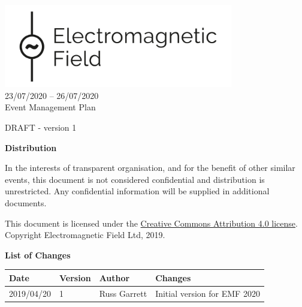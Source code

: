 

\newcommand{\st}{\textsuperscript{st} }
\newcommand{\nd}{\textsuperscript{nd} }
\renewcommand{\th}{\textsuperscript{th} }
\newcommand{\rd}{\textsuperscript{rd} }
\newcommand{\sq}{\textsuperscript{2}}




\begin{titlepage}
\thispagestyle{empty}
\begin{center}
    \includegraphics[width=10cm]{../resources/emf-logo.png}\\[24pt]
    {\LARGE 23/07/2020 -- 26/07/2020} \\[48pt]

    {\Large Event Management Plan}

    DRAFT - version 1

    \vfill

    \begin{framed}
        \textbf{Distribution}

        In the interests of transparent organisation, and for the benefit of other similar events,
        this document is not considered confidential and distribution is unrestricted.
        Any confidential information will be supplied in additional documents.
        
        \footnotesize{This document is licensed under the
        \href{https://creativecommons.org/licenses/by/4.0/}{Creative Commons Attribution 4.0 license}.
        Copyright Electromagnetic Field Ltd, 2019.}
    \end{framed}

    \textbf{List of Changes}
    \begin{tabular}{l | l | l | p{10cm}}
      Date & Version & Author & Changes \\
      \hline
      2019/04/20 & 1 & Russ Garrett & Initial version for EMF 2020 \\
    \end{tabular}
\end{center}
\end{titlepage}
\setcounter{page}{2}

\tableofcontents

\newpage



